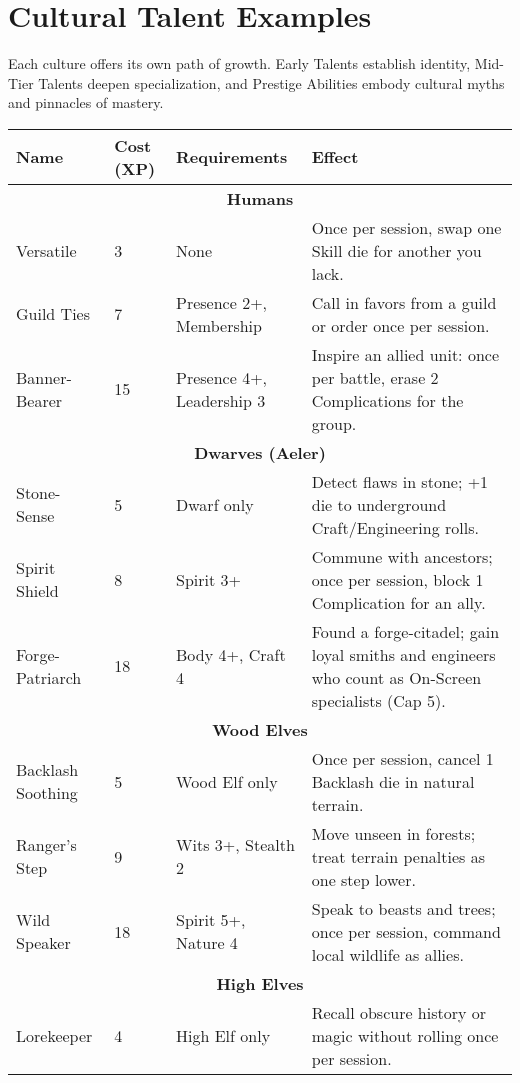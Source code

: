 \documentclass[12pt]{book}
\begin{document}
\section{Cultural Talent Examples}

Each culture offers its own path of growth. Early Talents establish identity, Mid-Tier Talents deepen specialization, and Prestige Abilities embody cultural myths and pinnacles of mastery.

\begin{table}[h]
\centering
\renewcommand{\arraystretch}{1.3}
\begin{tabular}{|p{3cm}|p{2cm}|p{3cm}|p{6cm}|}
\hline
\textbf{Name} & \textbf{Cost (XP)} & \textbf{Requirements} & \textbf{Effect} \\
\hline
\multicolumn{4}{|c|}{\textbf{Humans}} \\
\hline
Versatile & 3 & None & Once per session, swap one Skill die for another you lack. \\
Guild Ties & 7 & Presence 2+, Membership & Call in favors from a guild or order once per session. \\
Banner-Bearer & 15 & Presence 4+, Leadership 3 & Inspire an allied unit: once per battle, erase 2 Complications for the group. \\
\hline
\multicolumn{4}{|c|}{\textbf{Dwarves (Aeler)}} \\
\hline
Stone-Sense & 5 & Dwarf only & Detect flaws in stone; +1 die to underground Craft/Engineering rolls. \\
Spirit Shield & 8 & Spirit 3+ & Commune with ancestors; once per session, block 1 Complication for an ally. \\
Forge-Patriarch & 18 & Body 4+, Craft 4 & Found a forge-citadel; gain loyal smiths and engineers who count as On-Screen specialists (Cap 5). \\
\hline
\multicolumn{4}{|c|}{\textbf{Wood Elves}} \\
\hline
Backlash Soothing & 5 & Wood Elf only & Once per session, cancel 1 Backlash die in natural terrain. \\
Ranger’s Step & 9 & Wits 3+, Stealth 2 & Move unseen in forests; treat terrain penalties as one step lower. \\
Wild Speaker & 18 & Spirit 5+, Nature 4 & Speak to beasts and trees; once per session, command local wildlife as allies. \\
\hline
\multicolumn{4}{|c|}{\textbf{High Elves}} \\
\hline
Lorekeeper & 4 & High Elf only & Recall obscure history or magic without rolling once per session. \\

\end{tabular}
\end{table}
\end{document}
